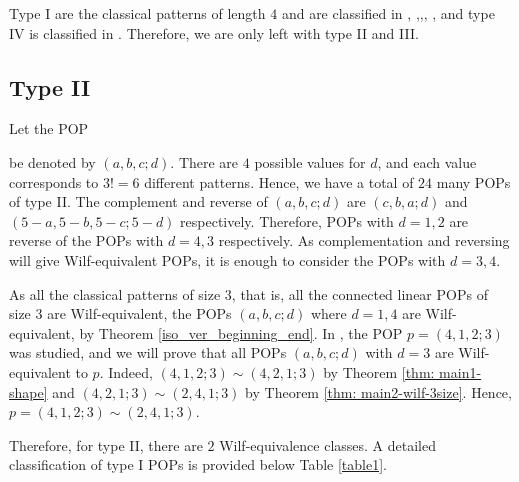 \documentclass[12pt, english, a4paper]{article}
\theoremstyle{plain}
\theoremstyle{definition}
\theoremstyle{remark}
\begin{document}
Type I are the classical patterns of length $4$ and are classified in \cite{Classical-4-len-pattern}, \cite{noy-elizalde-adv-appl},\cite{mireille},\cite{jaggard-prefix-involution}, \cite{forbidden_seq},\cite{1342} and type IV is classified in \cite{gao-kitaev-length-4-5-pops}. Therefore, we are only left with type II and III. 

\subsection{Type II}\label{len4_type2}
Let the POP  be denoted by $(a,b,c;d)$.
 There are $4$ possible values for $d$, and each value corresponds to $3!=6$ different patterns. Hence, we have a total of $24$ many POPs of type II. The complement and reverse of $(a,b,c;d)$ are $(c,b,a;d)$ and $(5-a,5-b,5-c;5-d)$ respectively. Therefore, POPs with $d=1,2$ are reverse of the POPs with $d=4,3$ respectively. 
 As complementation and reversing will give Wilf-equivalent POPs, it is enough to consider the POPs with $d=3,4$. 
 
  As all the classical patterns of size $3$, that is, all the connected linear POPs of size $3$ are Wilf-equivalent, the POPs $(a,b,c;d)$ where $d=1,4$ are Wilf-equivalent, by Theorem \ref{iso_ver_beginning_end}.
 In \cite[Theorem 24]{gao-kitaev-length-4-5-pops}, the POP $p=(4,1,2;3)$ was studied, and we will prove that all POPs $(a,b,c;d)$ with  $d=3$ are Wilf-equivalent to $p$. Indeed, $(4,1,2;3) \sim (4,2,1;3)$
 by Theorem \ref{thm: main1-shape} and  $(4,2,1;3) \sim (2,4,1;3)$  by Theorem \ref{thm: main2-wilf-3size}. Hence, $p=(4,1,2;3) \sim (2,4,1;3)$.  


Therefore, for type II, there are $2$ Wilf-equivalence classes. A detailed classification of type I POPs is provided below Table \ref{table1}.
\end{document}
